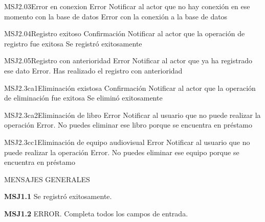 	\begin{Message}{MSJ2.03}{Error en conexion}
		\MSGitem[Tipo:] Error	
		\MSGitem[Objetivo: ] Notificar al actor que no hay conexión en ese momento con la base de datos
		\MSGitem[Redacción: ] Error con la conexión a la base de datos
	\end{Message}
	
	\begin{Message}{MSJ2.04}{Registro exitoso}
		\MSGitem[Tipo:] Confirmación	
		\MSGitem[Objetivo: ] Notificar al actor que la operación de registro fue exitosa
		\MSGitem[Redacción: ] Se registró exitosamente
	\end{Message}
	
	\begin{Message}{MSJ2.05}{Registro con anterioridad}
		\MSGitem[Tipo:] Error	
		\MSGitem[Objetivo: ] Notificar al actor que ya ha registrado ese dato
		\MSGitem[Redacción: ] Error. Has realizado el registro con anterioridad
	\end{Message}
	
	\begin{Message}{MSJ2.3ca1}{Eliminación existosa}
		\MSGitem[Tipo:] Confirmación	
		\MSGitem[Objetivo: ] Notificar al actor que la operación de eliminación fue exitosa
		\MSGitem[Redacción: ] Se eliminó exitosamente
	\end{Message}
	
	\begin{Message}{MSJ2.3ca2}{Eliminación de libro}
		\MSGitem[Tipo:] Error	
		\MSGitem[Objetivo: ] Notificar al usuario que no puede realizar la operación
		\MSGitem[Redacción: ] Error. No puedes eliminar ese libro porque se encuentra en préstamo
	\end{Message}
	
	\begin{Message}{MSJ2.3cc1}{Eliminación de equipo audiovisual}
		\MSGitem[Tipo:] Error	
		\MSGitem[Objetivo: ] Notificar al usuario que no puede realizar la operación
		\MSGitem[Redacción: ] Error. No puedes eliminar ese equipo porque se encuentra en préstamo
	\end{Message}
	
	

MENSAJES GENERALES
	\begin{Citemize}
	\item {\bf MSJ1.1} Se registró exitosamente.
	\end{Citemize}
	
	\begin{Citemize}
	\item {\bf MSJ1.2} ERROR. Completa todos los campos de entrada.
	\end{Citemize}
	
